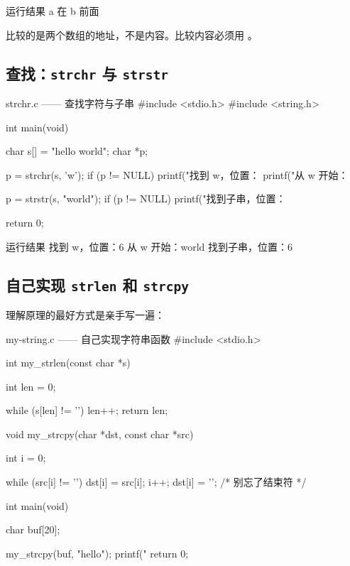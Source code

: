 \begin{outbox}{运行结果}
a 在 b 前面
\end{outbox}

\begin{pitfall}[字符串不能用 \texttt{==} 比较]
 比较的是两个数组的地址，不是内容。比较内容必须用 。
\end{pitfall}

\subsection{查找：\texttt{strchr} 与 \texttt{strstr}}

\begin{codebox}{strchr.c —— 查找字符与子串}
#include <stdio.h>
#include <string.h>

int main(void)
{
    char s[] = "hello world";
    char *p;

    p = strchr(s, 'w');
    if (p != NULL) {
        printf("找到 w，位置：%
        printf("从 w 开始：%
    }

    p = strstr(s, "world");
    if (p != NULL) {
        printf("找到子串，位置：%
    }

    return 0;
}
\end{codebox}

\begin{outbox}{运行结果}
找到 w，位置：6
从 w 开始：world
找到子串，位置：6
\end{outbox}

\subsection{自己实现 \texttt{strlen} 和 \texttt{strcpy}}

理解原理的最好方式是亲手写一遍：

\begin{codebox}{my-string.c —— 自己实现字符串函数}
#include <stdio.h>

int my_strlen(const char *s)
{
    int len = 0;

    while (s[len] != '\0') {
        len++;
    }
    return len;
}

void my_strcpy(char *dst, const char *src)
{
    int i = 0;

    while (src[i] != '\0') {
        dst[i] = src[i];
        i++;
    }
    dst[i] = '\0';      /* 别忘了结束符 */
}

int main(void)
{
    char buf[20];

    my_strcpy(buf, "hello");
    printf("%
    return 0;
}
\end{codebox}


